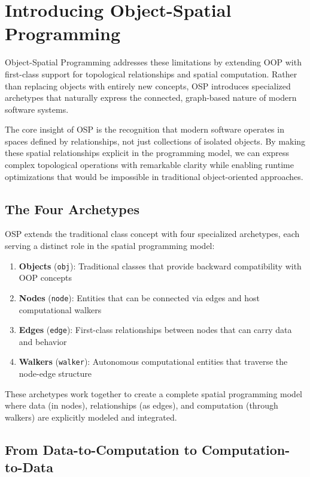 \section{Introducing Object-Spatial Programming}

Object-Spatial Programming addresses these limitations by extending OOP with first-class support for topological relationships and spatial computation. Rather than replacing objects with entirely new concepts, OSP introduces specialized archetypes that naturally express the connected, graph-based nature of modern software systems.

The core insight of OSP is the recognition that modern software operates in spaces defined by relationships, not just collections of isolated objects. By making these spatial relationships explicit in the programming model, we can express complex topological operations with remarkable clarity while enabling runtime optimizations that would be impossible in traditional object-oriented approaches.

\subsection{The Four Archetypes}

OSP extends the traditional class concept with four specialized archetypes, each serving a distinct role in the spatial programming model:

\begin{enumerate}
    \item \textbf{Objects} (\texttt{obj}): Traditional classes that provide backward compatibility with OOP concepts
    \item \textbf{Nodes} (\texttt{node}): Entities that can be connected via edges and host computational walkers
    \item \textbf{Edges} (\texttt{edge}): First-class relationships between nodes that can carry data and behavior
    \item \textbf{Walkers} (\texttt{walker}): Autonomous computational entities that traverse the node-edge structure
\end{enumerate}

These archetypes work together to create a complete spatial programming model where data (in nodes), relationships (as edges), and computation (through walkers) are explicitly modeled and integrated.

\subsection{From Data-to-Computation to Computation-to-Data}

